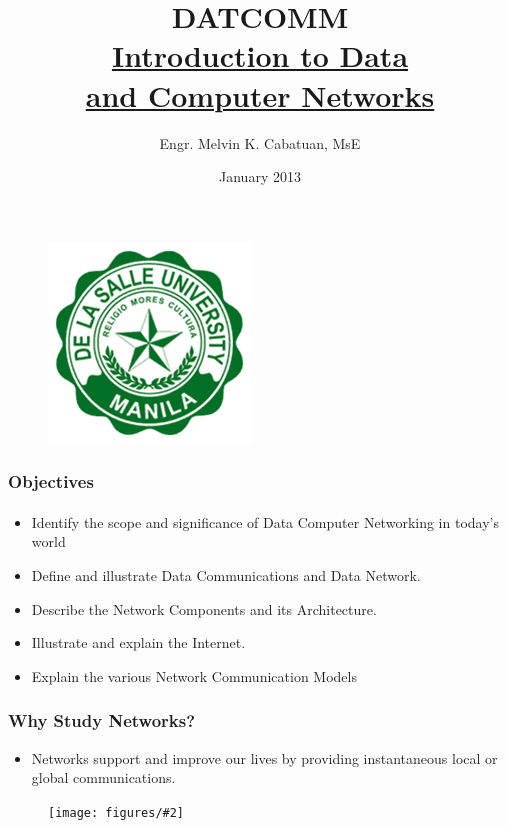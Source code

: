 \documentclass{beamer}
\newcommand{\ns}{\vspace{-0.5cm}}  %
\newcommand{\fig}[2]{
\begin{center}
\begin{figure}
\texttt{[image: figures/\#2]}
\end{figure}
\end{center}
}
\begin{document}
\ECFAugie

\begin{frame}

\begin{center}
\begin{figure}
\includegraphics[scale=0.3]{figures/dlsulogo}
\end{figure}
\end{center}
\ns

\title{DATCOMM  \\ \underline{Introduction to Data } \\ \underline{and Computer Networks}}
\author{Engr. Melvin K. Cabatuan, MsE}
\date{January 2013}
\maketitle
\end{frame}

\begin{frame}
\frametitle{Objectives}
\framesubtitle{}
\begin{itemize} 
\Large
\item <1-> Identify the scope and significance of Data Computer Networking in today's world
\item <2-> Define and illustrate Data Communications and Data Network.
\item <3-> Describe the Network Components and its Architecture.
\item <4-> Illustrate and explain the Internet.
\item <5-> Explain the various Network Communication Models

\end{itemize}
\end{frame}


\begin{frame}
\frametitle{Why Study Networks?}
 \begin{itemize} 
\Large
\item <1-> Networks support and improve our lives by providing instantaneous local or global communications. 
\end{itemize}
\fig{0.45}{network_adv}
\end{frame}
\end{document}
